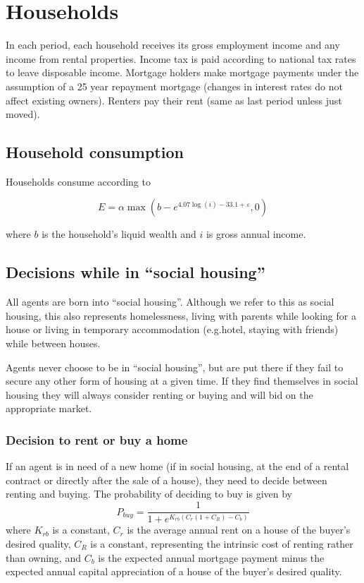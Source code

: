 \documentclass{article}
\begin{document}
\section{Households}

In each period, each household receives its gross employment income and any income from rental properties. Income tax is paid according to national tax rates to leave disposable income. Mortgage holders make mortgage payments under the assumption of a 25 year repayment mortgage (changes in interest rates do not affect existing owners). Renters pay their rent (same as last period unless just moved).

\subsection{Household consumption}

Households consume according to

\begin{equation}
E=\alpha \max \left( b-e^{4.07\log (i)-33.1+\varepsilon },0\right)
\end{equation}

where $b$ is the household's liquid wealth and $i$ is gross annual income.

\subsection{Decisions while in ``social housing''}
All agents are born into ``social housing''. Although we refer to this as social housing, this also represents homelessness, living with parents while looking for a house or living in temporary accommodation (e.g.hotel, staying with friends) while between houses.

Agents never choose to be in ``social housing'', but are put there if they fail to secure any other form of housing at a given time. If they find themselves in social housing they will always consider renting or buying and will bid on the appropriate market.

\subsubsection{Decision to rent or buy a home}
If an agent is in need of a new home (if in social housing, at the end of a rental contract or directly after the sale of a house), they need to decide between renting and buying. The probability of deciding to buy is given by
\[
P_{buy} = \frac{1}{1 + e^{K_{rb}(C_{r}(1+C_R) - C_{b})}}
\]
where $K_{rb}$ is a constant, $C_{r}$ is the average annual rent on a house of the buyer's desired quality, $C_R$ is a constant, representing the intrinsic cost of renting rather than owning, and $C_{b}$ is the expected annual mortgage payment minus the expected annual capital appreciation of a house of the buyer's desired quality.
\end{document}
